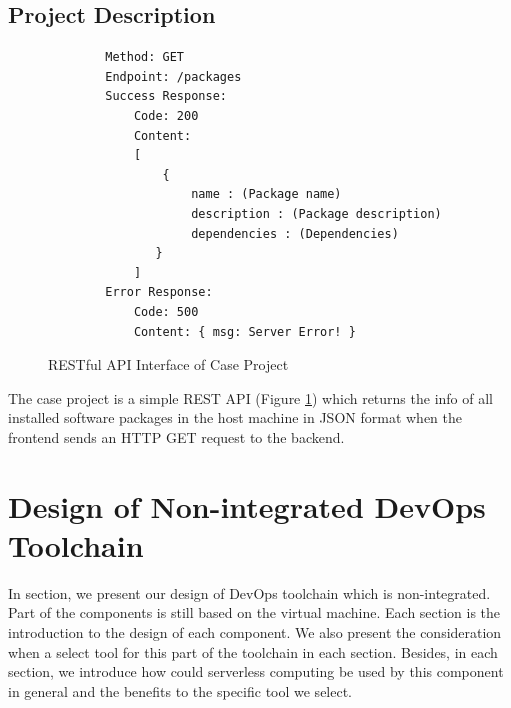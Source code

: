 \subsection{Project Description}
\begin{figure}[!h]
    \begin{verbatim}
        Method: GET
        Endpoint: /packages
        Success Response:
            Code: 200
            Content: 
            [
                {
                    name : (Package name)
                    description : (Package description)
                    dependencies : (Dependencies) 
               }
            ]
        Error Response:
            Code: 500
            Content: { msg: Server Error! }
        \end{verbatim}
        \label{fig:rest}
\caption{RESTful API Interface of Case Project}      
\end{figure}
The case project is a simple REST API (Figure \ref{fig:rest}) which returns the info of all installed software packages in the host machine in JSON format when the frontend sends an HTTP GET request to the backend.
\section{Design of Non-integrated DevOps Toolchain}
In section, we present our design of  DevOps toolchain which is non-integrated. Part of the components is still based on the virtual machine. Each section is the introduction to the design of each component. We also present the consideration when a select tool for this part of the toolchain in each section. Besides, in each section, we introduce how could serverless computing be used by this component in general and the benefits to the specific tool we select.
